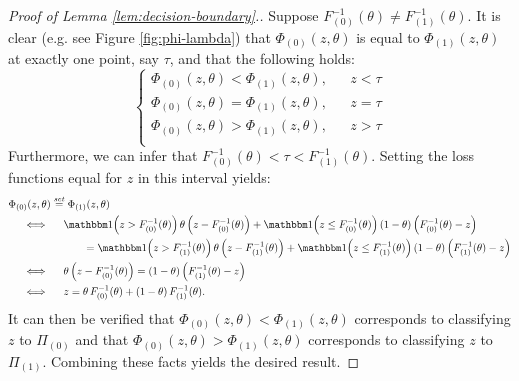 \begin{proof}[Proof of Lemma \ref{lem:decision-boundary}.]
  Suppose $F_{(0)}^{-1}(\theta) \ne F_{(1)}^{-1}(\theta)$.  It is clear
  (e.g. see Figure \ref{fig:phi-lambda}) that $\Phi_{(0)}(z, \theta)$ is
  equal to $\Phi_{(1)}(z, \theta)$ at exactly one point, say $\tau$, and that
  the following holds:
  \begin{equation*}
    \left\{
      \begin{array}{lll}
        \Phi_{(0)}(z, \theta) < \Phi_{(1)}(z, \theta), & & z < \tau \\[1ex]
        \Phi_{(0)}(z, \theta) = \Phi_{(1)}(z, \theta), & & z = \tau \\[1ex]
        \Phi_{(0)}(z, \theta) > \Phi_{(1)}(z, \theta), & & z > \tau \\
      \end{array}
    \right.
  \end{equation*}
  Furthermore, we can infer that
  $F_{(0)}^{-1}(\theta) < \tau < F_{(1)}^{-1}(\theta)$.  Setting the loss
  functions equal for $z$ in this interval yields:
  \begin{align*}
    & \Phi_{(0)}(z, \theta) \stackrel{\mathit{set}}{=} \Phi_{(1)}(z, \theta) \\
    & \hspace{5mm} \Longleftrightarrow \hspace{5mm}
      \ind\!\! \left(z > F_{(0)}^{-1}(\theta)\right) \theta
      \left(z - F_{(0)}^{-1}(\theta)\right) +
      \ind\!\! \left(z \leq F_{(0)}^{-1}(\theta)\right) (1 - \theta)
      \left(F_{(0)}^{-1}(\theta) - z\right) \\
    & \hspace{25mm} =
      \ind\!\! \left(z > F_{(1)}^{-1}(\theta)\right) \theta
      \left(z - F_{(1)}^{-1}(\theta)\right) +
      \ind\!\! \left(z \leq F_{(1)}^{-1}(\theta)\right) (1 - \theta)
      \left(F_{(1)}^{-1}(\theta) - z\right) \\
    & \hspace{5mm} \Longleftrightarrow \hspace{5mm}
      \theta \left(z - F_{(0)}^{-1}(\theta)\right) =
      (1 - \theta) \left(F_{(1)}^{-1}(\theta) - z\right) \\
    & \hspace{5mm} \Longleftrightarrow \hspace{5mm}
      z = \theta\, F_{(0)}^{-1}(\theta) + (1 - \theta)\, F_{(1)}^{-1}(\theta).
  \end{align*}
  It can then be verified that $\Phi_{(0)}(z, \theta) < \Phi_{(1)}(z, \theta)$
  corresponds to classifying $z$ to $\Pi_{(0)}$ and that
  $\Phi_{(0)}(z, \theta) > \Phi_{(1)}(z, \theta)$ corresponds to classifying $z$
  to $\Pi_{(1)}$.  Combining these facts yields the desired result.
\end{proof}

